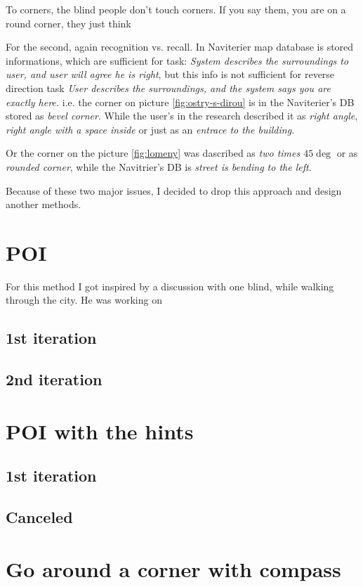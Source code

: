 				To corners, the blind people don't touch corners. If you say them, you are on a round corner, they just think 
				
				For the second, again recognition vs. recall. In Naviterier map database\cite{naviterier-map-details} is stored informations, which are sufficient for task: \emph{System describes the surroundings to user, and user will agree he is right}, but this info is not sufficient for reverse direction task \emph{User describes the surroundings, and the system says you are exactly here.} i.e. the corner on picture \ref{fig:ostry-s-dirou} is in the Naviterier's DB stored as \emph{bevel corner}. While the user's in the research described it as \emph{right angle}, \emph{right angle with a space inside} or just as an \emph{entrace to the building}.
				
				Or the corner on the picture \ref{fig:lomeny} was dascribed as \emph{two times $45\deg$} or as \emph{rounded corner}, while the Navitrier's DB is \emph{street is bending to the left}.
				
				Because of these two major issues, I decided to drop this approach and design another methods.
				
		\section{POI}
			For this method I got inspired by a discussion with one blind, while walking through the city. He was working on 
				
			\subsection{1st iteration}
			\subsection{2nd iteration}		
		\section{POI with the hints}
			\subsection{1st iteration}
			\subsection{Canceled}	
		\section{Go around a corner with compass}
